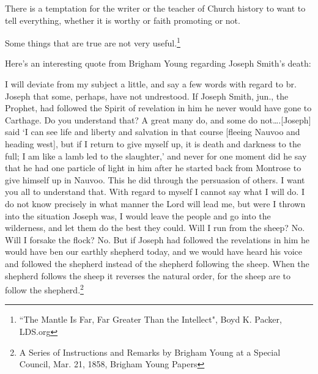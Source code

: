 \begin{displayquote}
There is a temptation for the writer or the teacher of Church history to want to tell 
everything, whether it is worthy or faith promoting or not.

Some things that are true are not very useful.\footnote{``The Mantle Is Far, Far 
Greater Than the Intellect", Boyd K. Packer, LDS.org}
\end{displayquote}

Here's an interesting quote from Brigham Young regarding Joseph Smith's death:

\begin{displayquote}
I will deviate from my subject a little, and say a few words with regard to br.
Joseph that some, perhaps, have not undrestood. If Joseph Smith, jun., the Prophet,
had followed the Spirit of revelation in him he never would have gone to Carthage. Do
you understand that? A great many do, and some do not….[Joseph] said `I can see life
and liberty and salvation in that course [fleeing Nauvoo and heading west], but if I
return to give myself up, it is death and darkness to the full; I am like a lamb led
to the slaughter,' and never for one moment did he say that he had one particle of
light in him after he started back from Montrose to give himself up in Nauvoo. This
he did through the persuasion of others. I want you all to understand that. With
regard to myself I cannot say what I will do. I do not know precisely in what manner
the Lord will lead me, but were I thrown into the situation Joseph was, I would leave
the people and go into the wilderness, and let them do the best they could. Will I
run from the sheep? No. Will I forsake the flock? No. But if Joseph had followed the
revelations in him he would have ben our earthly shepherd today, and we would have
heard his voice and followed the shepherd instead of the shepherd following the
sheep. When the shepherd follows the sheep it reverses the natural order, for the
sheep are to follow the shepherd.\footnote{A Series of Instructions and Remarks
by Brigham Young at a Special Council, Mar. 21, 1858, Brigham Young Papers}
\end{displayquote}